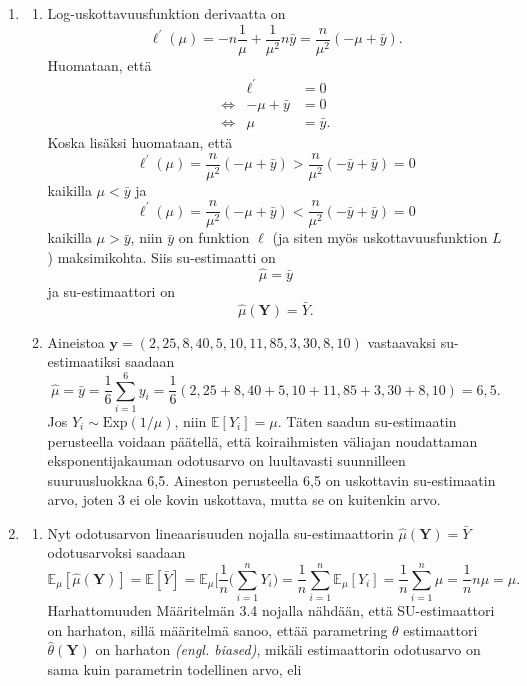 \documentclass[12pt]{article}
\begin{document}
\begin{enumerate}
\begin{enumerate}
\end{enumerate}
\item[2.] 
\begin{enumerate}
\item[(a)] Log-uskottavuusfunktion derivaatta on
$$
\ell^\prime(\mu) = -n \frac{1}{\mu} + \frac{1}{\mu^2} n\bar{y} = \frac{n}{\mu^2}(-\mu + \bar{y}).
$$
Huomataan, että
$$
\begin{array}{lll}
& \ell^\prime &= 0 \\
\Leftrightarrow & -\mu + \bar{y} &= 0 \\
\Leftrightarrow & \mu &= \bar{y}.
\end{array}
$$
Koska lisäksi huomataan, että
$$
\ell^\prime(\mu) = \frac{n}{\mu^2}(-\mu + \bar{y}) > \frac{n}{\mu^2}(-\bar{y} + \bar{y}) = 0
$$
kaikilla $\mu < \bar{y}$ ja
$$
\ell^\prime(\mu) = \frac{n}{\mu^2}(-\mu + \bar{y}) < \frac{n}{\mu^2}(-\bar{y} + \bar{y}) = 0
$$
kaikilla $\mu > \bar{y}$, niin $\bar{y}$ on funktion $\ell$ (ja siten myös uskottavuusfunktion $L$) maksimikohta.
Siis su-estimaatti on
$$
\hat{\mu} = \bar{y}
$$
ja su-estimaattori on 
$$
\hat{\mu}(\textbf{Y}) = \bar{Y}.
$$
\item[(b)] Aineistoa $\textbf{y} = (2,25, 8,40, 5,10, 11,85, 3,30, 8,10)$ vastaavaksi su-estimaatiksi saadaan
$$
\hat{\mu} = \bar{y} = \frac{1}{6}\sum_{i = 1}^6 y_i = \frac{1}{6}(2,25 + 8,40 + 5,10 + 11,85 + 3,30 + 8,10) = 6,5.
$$
Jos $Y_i \sim \text{Exp}(1/\mu)$, niin $\mathbb{E}[Y_i] = \mu$. Täten saadun su-estimaatin perusteella voidaan päätellä, että koiraihmisten väliajan noudattaman eksponentijakauman odotusarvo on luultavasti suunnilleen suuruusluokkaa 6,5. Aineston perusteella 6,5 on uskottavin su-estimaatin arvo, joten 3 ei ole kovin uskottava, mutta se on kuitenkin arvo.
\end{enumerate}
\item[3.] 
\begin{enumerate}
\item[(a)] Nyt odotusarvon lineaarisuuden nojalla su-estimaattorin $\hat{\mu}(\textbf{Y}) = \bar{Y}$ odotusarvoksi saadaan
$$
\mathbb{E}_\mu[\hat{\mu}(\textbf{Y})] = \mathbb{E}[\bar{Y}] = \mathbb{E}_\mu[\frac{1}{n} \Bigg( \sum_{i = 1}^n Y_i \Bigg) = \frac{1}{n} \sum_{i = 1}^n \mathbb{E}_\mu[Y_i] = \frac{1}{n} \sum_{i = 1}^n \mu = \frac{1}{n}n\mu = \mu.
$$
Harhattomuuden Määritelmän 3.4 nojalla nähdään, että SU-estimaattori on harhaton, sillä määritelmä sanoo, ettää parametring $\theta$ estimaattori $\hat{\theta}(\textbf{Y})$ on harhaton \textit{(engl. biased)}, mikäli estimaattorin odotusarvo on sama kuin parametrin todellinen arvo, eli

\end{enumerate}
\end{enumerate}
\end{document}
